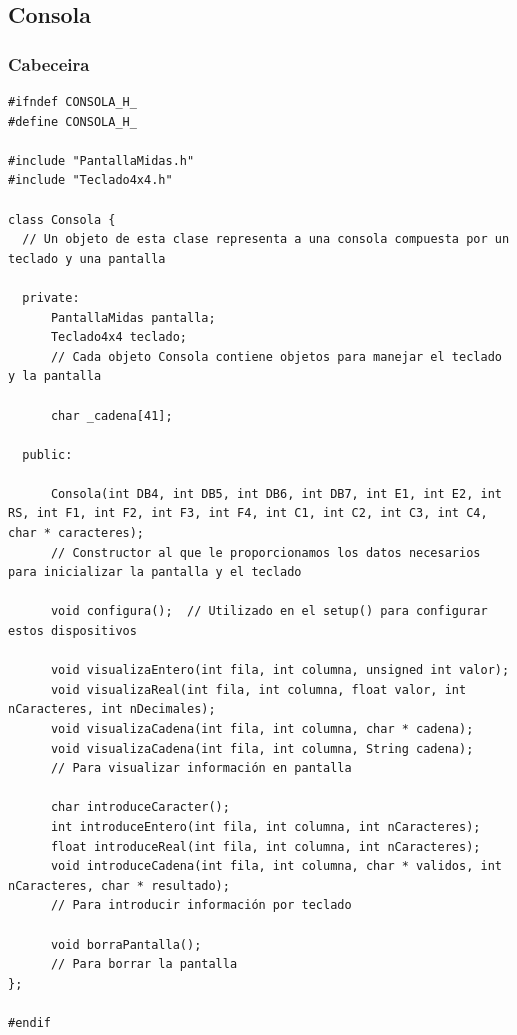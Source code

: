 \documentclass[11pt,twoside]{book}
\begin{document}
\subsection{Consola}
\subsubsection{Cabeceira}
\begin{lstlisting}
#ifndef CONSOLA_H_
#define CONSOLA_H_

#include "PantallaMidas.h"
#include "Teclado4x4.h"

class Consola {
  // Un objeto de esta clase representa a una consola compuesta por un teclado y una pantalla
  
  private:
      PantallaMidas pantalla;
      Teclado4x4 teclado;
      // Cada objeto Consola contiene objetos para manejar el teclado y la pantalla
      
      char _cadena[41];
      
  public: 
  
      Consola(int DB4, int DB5, int DB6, int DB7, int E1, int E2, int RS, int F1, int F2, int F3, int F4, int C1, int C2, int C3, int C4, char * caracteres);
      // Constructor al que le proporcionamos los datos necesarios para inicializar la pantalla y el teclado
      
      void configura();  // Utilizado en el setup() para configurar estos dispositivos
      
      void visualizaEntero(int fila, int columna, unsigned int valor);
      void visualizaReal(int fila, int columna, float valor, int nCaracteres, int nDecimales);
      void visualizaCadena(int fila, int columna, char * cadena);  
      void visualizaCadena(int fila, int columna, String cadena);
      // Para visualizar información en pantalla
      
      char introduceCaracter();
      int introduceEntero(int fila, int columna, int nCaracteres);
      float introduceReal(int fila, int columna, int nCaracteres);
      void introduceCadena(int fila, int columna, char * validos, int nCaracteres, char * resultado);
      // Para introducir información por teclado
      
      void borraPantalla();
      // Para borrar la pantalla
};

#endif
\end{lstlisting}
\end{document}
